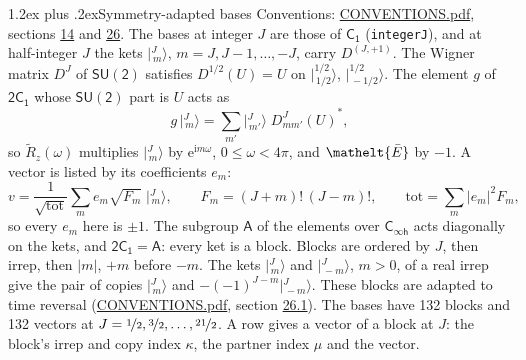 \documentclass[10pt,a4paper]{article}
\makeatletter
\renewcommand\section{\@startsection{section}{1}{\z@}{-3ex plus -1ex minus -.2ex}%
  {1.2ex plus .2ex}{\normalfont\large\sffamily\bfseries\color{parttitle}}}
\numberwithin{equation}{section}
\newcommand{\eltfont}[1]{{\let\sigma\eltsigma\mathelt{#1}}}
\newcommand{\grp}[1]{\mathsf{#1}}
\newcommand{\elt}[1]{\eltfont{#1}}
\newcommand{\iunit}{\mathrm{i}}
\newcommand{\expe}{\mathrm{e}}
\newcommand{\irrJp}[2]{D^{(#1,#2)}}
\newcommand{\wignerD}[1]{D^{#1}}
\newcommand{\conj}[1]{{#1}^{*}}
\newcommand{\mult}{\kappa}
\newcommand{\intx}{\mu}
\newcommand{\jm}[2]{\bigl\lvert{}^{#1}_{\,#2}\bigr\rangle}
\newcommand{\barred}[1]{\bar{#1}}
\newcommand{\lift}[1]{\tilde{#1}}
\makeatother
\begin{document}
\section{Symmetry-adapted bases}\label{s:bases}
Conventions: \href{../../CONVENTIONS.pdf}{CONVENTIONS.pdf}, sections \href{../../../rotation/CONVENTIONS.pdf\#conv.14}{14} and \href{../../CONVENTIONS.pdf\#conv.26}{26}.
\leavevmode\label{n:index.m}\label{n:vector.ket}The bases at integer $J$ are those of \href{../../../rotation/data/pdf/C1.pdf}{$\grp{C_{1}}$} (\texttt{integerJ}), and at half-integer $J$ the kets $\jm{J}{m}$, $m = J, J-1, \dots, -J$, carry $\irrJp{J}{+1}$. \label{n:matrix.wigner}The Wigner matrix $\wignerD{J}$ of $\grp{SU(2)}$ satisfies $\wignerD{1/2}(U) = U$ on $\jm{1/2}{1/2}$, $\jm{1/2}{-1/2}$. The element $g$ of $\grp{2C_{1}}$ whose $\grp{SU(2)}$ part is $U$ acts as
\begin{equation}\label{e:action}g\,\jm{J}{m} = \sum_{m'} \jm{J}{m'}\; \conj{\wignerD{J}_{m m'}(U)},\end{equation}
so $\lift{R}_{z}(\omega)$ multiplies $\jm{J}{m}$ by $\expe^{\iunit m\omega}$, $0 \le \omega < 4\pi$, and $\elt{\barred{E}}$ by $-1$. \label{n:index.ketcoefficient}\label{n:vector.basis.symmetry}\label{n:index.ketweight}\label{n:index.total}A vector is listed by its coefficients $e_m$:
\begin{equation}\label{e:ket}v = \frac{1}{\sqrt{\mathrm{tot}}}\sum_m e_m\sqrt{F_m}\;\jm{J}{m},\qquad F_m = (J+m)!\,(J-m)!,\qquad \mathrm{tot} = \sum_m |e_m|^2F_m,\end{equation}
so every $e_m$ here is $\pm 1$.
\leavevmode\label{n:group.A}The subgroup $\grp{A}$ of the elements over $\grp{C_{\infty h}}$ acts diagonally on the kets, and $\grp{2C_{1}} = \grp{A}$: every ket is a block. Blocks are ordered by $J$, then irrep, then $|m|$, $+m$ before $-m$. The kets $\jm{J}{m}$ and $\jm{J}{-m}$, $m > 0$, of a real irrep give the pair of copies $\jm{J}{m}$ and $-(-1)^{J-m}\jm{J}{-m}$. These blocks are adapted to time reversal (\href{../../CONVENTIONS.pdf}{CONVENTIONS.pdf}, section \href{../../CONVENTIONS.pdf\#conv.26.1}{26.1}).
The bases have 132 blocks and 132 vectors at $J = \nicefrac{1}{2}, \nicefrac{3}{2}, \dots, \nicefrac{21}{2}$. \label{n:index.copy}\label{n:head.vector}A row gives a vector of a block at $J$: the block's irrep and copy index $\mult$, the partner index $\intx$ and the vector.
\end{document}
